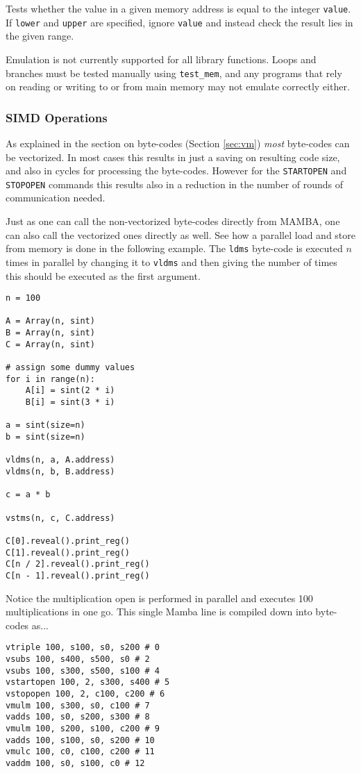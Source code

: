 Tests whether the value in a given memory address is equal to the integer
\verb|value|. If \verb|lower| and \verb|upper| are specified, ignore \verb|value|
and instead check the result lies in the given range.

Emulation is not currently supported for all library functions. Loops and
branches must be tested manually using \verb|test_mem|, and any programs that
rely on reading or writing to or from main memory may not emulate correctly
either.

\subsubsection{SIMD Operations}
As explained in the section on byte-codes (Section \ref{sec:vm}) {\em most} byte-codes
can be vectorized.
In most cases this results in just a saving on resulting code size, and also
in cycles for processing the byte-codes.
However for the \verb|STARTOPEN| and \verb|STOPOPEN| commands this
results also in a reduction in the number of rounds of communication needed.

Just as one can call the non-vectorized byte-codes directly from MAMBA, one
can also call the vectorized ones directly as well. See how a parallel
load and store from memory is done in the following example.
The \verb|ldms| byte-code is executed $n$ times in parallel by
changing it to \verb|vldms| and then giving the number of
times this should be executed as the first argument.
\begin{lstlisting}
n = 100

A = Array(n, sint)
B = Array(n, sint)
C = Array(n, sint)

# assign some dummy values
for i in range(n):
    A[i] = sint(2 * i)
    B[i] = sint(3 * i)

a = sint(size=n)
b = sint(size=n)

vldms(n, a, A.address)
vldms(n, b, B.address)

c = a * b

vstms(n, c, C.address)

C[0].reveal().print_reg()
C[1].reveal().print_reg()
C[n / 2].reveal().print_reg()
C[n - 1].reveal().print_reg()
\end{lstlisting}
Notice the multiplication open is performed in parallel and executes
100 multiplications in one go.
This single Mamba line is compiled down into byte-codes as...
\begin{lstlisting}
vtriple 100, s100, s0, s200 # 0
vsubs 100, s400, s500, s0 # 2
vsubs 100, s300, s500, s100 # 4
vstartopen 100, 2, s300, s400 # 5
vstopopen 100, 2, c100, c200 # 6
vmulm 100, s300, s0, c100 # 7
vadds 100, s0, s200, s300 # 8
vmulm 100, s200, s100, c200 # 9
vadds 100, s100, s0, s200 # 10
vmulc 100, c0, c100, c200 # 11
vaddm 100, s0, s100, c0 # 12
\end{lstlisting}


